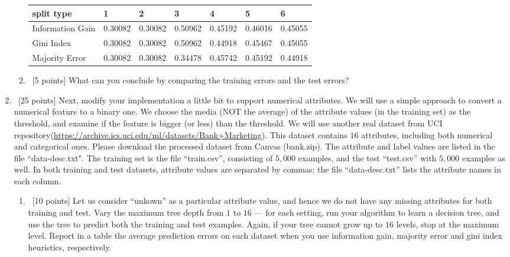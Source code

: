 \documentclass[12pt, fullpage,letterpaper]{article}
\begin{document}
\begin{enumerate}
\begin{enumerate}
\begin{tabular}{|l|l|l|l|l|l|l|}
	\hline
	split type       & 1       & 2       & 3       & 4       & 5       & 6       \\ \hline
	Information Gain & 0.30082 & 0.30082 & 0.50962 & 0.45192 & 0.46016 & 0.45055 \\ \hline
	Gini Index       & 0.30082 & 0.30082 & 0.50962 & 0.44918 & 0.45467 & 0.45055 \\ \hline
	Majority Error   & 0.30082 & 0.30082 & 0.34478 & 0.45742 & 0.45192 & 0.44918 \\ \hline
	\end{tabular}

\item~[5 points] What can you conclude by comparing the training errors and the test errors? 
\end{enumerate}


\item~[25 points] Next, modify your implementation a little bit to support numerical attributes. We will use a simple approach to convert a numerical feature to a binary one. We choose the media (NOT the average) of the attribute values (in the training set) as the threshold, and examine if the feature is bigger (or less) than the threshold. We will use another real dataset from UCI repository(\url{https://archive.ics.uci.edu/ml/datasets/Bank+Marketing}). This dataset contains $16$ attributes, including both numerical and categorical ones. Please download the processed dataset from Canvas (bank.zip).  The attribute and label values are listed in the file ``data-desc.txt". The training set is the file ``train.csv'', consisting of $5,000$ examples, and the test  ``test.csv'' with $5,000$ examples as well.  In both training and test datasets, attribute values are separated by commas; the file ``data-desc.txt''  lists the attribute names in each column. 
\begin{enumerate}
	\item~[10 points] Let us consider ``unkown'' as a particular attribute value, and hence we do not have any missing attributes for both training and test. Vary the maximum  tree depth from $1$ to $16$ --- for each setting, run your algorithm to learn a decision tree, and use the tree to  predict both the training  and test examples. Again, if your tree cannot grow up to $16$ levels, stop at the maximum level. Report in a table the average prediction errors on each dataset when you use information gain, majority error and gini index heuristics, respectively.
	

\end{enumerate}
\end{enumerate}
\end{document}
